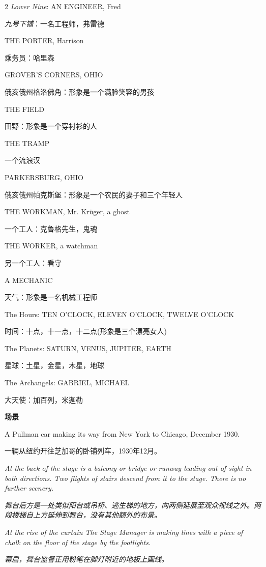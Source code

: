 \documentclass[lang=cn,newtx,10pt,scheme=chinese]{elegantbook}
\newcommand{\pair}[2]{%
\switchcolumn* #2\par
\switchcolumn  #1\par
}
\begin{document}
\begin{paracol}{2}
\pair{\textit{九号下铺}：一名工程师，弗雷德}{\textit{Lower Nine}: AN ENGINEER, Fred}

\pair{乘务员：哈里森}{THE PORTER, Harrison}


\pair{俄亥俄州格洛佛角：形象是一个满脸笑容的男孩}{GROVER'S CORNERS, OHIO}
\pair{田野：形象是一个穿衬衫的人}{THE FIELD}
\pair{一个流浪汉}{THE TRAMP}
\pair{俄亥俄州帕克斯堡：形象是一个农民的妻子和三个年轻人}{PARKERSBURG, OHIO}
\pair{一个工人：克鲁格先生，鬼魂}{THE WORKMAN, Mr. Krüger, a ghost}
\pair{另一个工人：看守}{THE WORKER, a watchman}
\pair{天气：形象是一名机械工程师}{A MECHANIC}
\pair{时间：十点，十一点，十二点(形象是三个漂亮女人)}{The Hours: TEN O'CLOCK, ELEVEN O'CLOCK, TWELVE O'CLOCK}
\pair{星球：土星，金星，木星，地球}{The Planets: SATURN, VENUS, JUPITER, EARTH}
\pair{
    大天使：加百列，米迦勒
}{
    The Archangels: GABRIEL, MICHAEL
    \newline
    \newline
    \newline
}

\pair{
    {\huge \textbf{场景}}
}{
    {\huge \textbf{SETTING}}
    \newline
    \newline
    \newline
}

\pair{
    一辆从纽约开往芝加哥的卧铺列车，1930年12月。
}{
    A Pullman car making its way from New York to Chicago, December 1930.
}

\pair{
    \textit{舞台后方是一处类似阳台或吊桥、逃生梯的地方，向两侧延展至观众视线之外。两段楼梯自上方延伸到舞台，没有其他额外的布景。}
}{
    \textit{At the back of the stage is a balcony or bridge or runway leading out of sight in both directions. Two flights of stairs descend from it to the stage. There is no further scenery.}
}

\pair{
    \textit{幕启，舞台监督正用粉笔在脚灯附近的地板上画线。}
}{
    \textit{At the rise of the curtain The Stage Manager is making lines with a piece of chalk on the floor of the stage by the footlights.}
}


\end{paracol}
\end{document}
